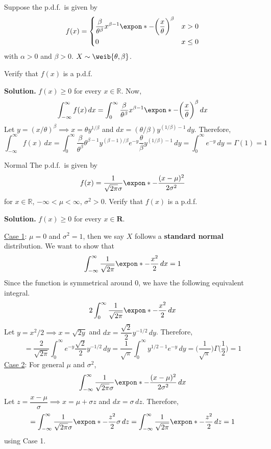 \begin{Example}{}{}
    Suppose the p.d.f.\ is given by
    \[ f(x)=\begin{dcases}
            \frac{\beta}{\theta^\beta}x^{\beta-1}
            \expon*{-\biggl(\frac{x}{\theta}\biggr)^\beta} & x>0    \\
            0                                              & x\le 0
        \end{dcases} \]
    with $ \alpha>0 $ and $ \beta>0 $.
    $ X \sim \weib{\theta,\beta} $.

    Verify that $ f(x) $ is a p.d.f.

    \textbf{Solution.} $ f(x)\ge 0 $ for every $ x\in\mathbb{R} $. Now,
    \[ \int_{-\infty}^{\infty} f(x)\, d{x} =
        \int_{0}^{\infty} \frac{\beta}{\theta^\beta}x^{\beta-1}
        \expon*{-\biggl(\frac{x}{\theta}\biggr)^\beta} \, d{x} \]
    Let $ y=(x/\theta)^\beta \implies
        x=\theta y^{1/\beta} $ and $ dx=(\theta/\beta) y^{(1/\beta)-1}\,dy $.
    Therefore,
    \[ \int_{-\infty}^{\infty} f(x)\, d{x}=\int_{0}^{\infty} \frac{\beta}{\theta^\beta} \theta^{\beta-1}
        y^{(\beta-1)/\beta}e^{-y}\frac{\theta}{\beta} y^{(1/\beta)-1}\, d{y}
        =\int_{0}^{\infty} e^{-y}\, d{y}=\Gamma(1)=1  \]
\end{Example}

\begin{Example}{Normal}{}
    The p.d.f.\ is given by
    \[ f(x)=\frac{1}{\sqrt{2\pi}\sigma}\expon*{-\frac{(x-\mu)^2}{2\sigma^2}}  \]
    for $ x\in\mathbb{R} $, $ -\infty<\mu<\infty $, $ \sigma^2>0 $.
    Verify that $ f(x) $ is a p.d.f.

    \textbf{Solution.} $ f(x)\ge 0 $ for every $ x\in\mathbf{R} $.

    \underline{Case 1}: $ \mu=0 $ and $ \sigma^2=1 $, then
    we say $ X $ follows a \textbf{standard normal} distribution.
    We want to show that
    \[ \int_{-\infty}^{\infty} \frac{1}{\sqrt{2\pi}}\expon*{-\frac{x^2}{2}} \, d{x}=1  \]
    Since the function is symmetrical around 0, we have the following equivalent integral.
    \[ 2\int_{0}^{\infty} \frac{1}{\sqrt{2\pi}}\expon*{-\frac{x^2}{2}} \, d{x}  \]
    Let $ y=x^2/2\implies x=\sqrt{2y} $
    and $ dx=\dfrac{\sqrt{2}}{2} y^{-1/2}\,dy $. Therefore,
    \[ =\frac{2}{\sqrt{2\pi}}\int_{0}^{\infty} e^{-y}\frac{\sqrt{2}}{2} y^{-1/2}\, d{y}
        =\frac{1}{\sqrt{\pi}}\int_{0}^{\infty} y^{1/2-1}e^{-y}\, d{y}=
        \biggl(\frac{1}{\sqrt{\pi}}\biggr)\Gamma\biggl(\frac{1}{2}\biggr)=1    \]
    \underline{Case 2}: For general $ \mu $ and $ \sigma^2 $,
    \[ \int_{-\infty}^{\infty}  \frac{1}{\sqrt{2\pi}\sigma}\expon*{-\frac{(x-\mu)^2}{2\sigma^2}} \, d{x} \]
    Let $ z=\dfrac{x-\mu}{\sigma}\implies x=\mu+\sigma z  $
    and $ dx=\sigma\,dz $. Therefore,
    \[ =\int_{-\infty}^{\infty} \frac{1}{\sqrt{2\pi}\sigma}
        \expon*{-\frac{z^2}{2}}\sigma \, d{z}=
        \int_{-\infty}^{\infty} \frac{1}{\sqrt{2\pi}}\expon*{-\frac{z^2}{2}} \, d{z}=1   \]
    using Case 1.
\end{Example}
